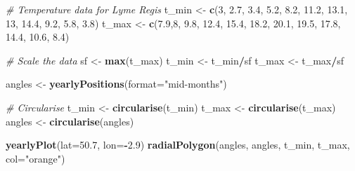 \documentclass[
]{book}
\newenvironment{Shaded}{\begin{snugshade}}{\end{snugshade}}
\newcommand{\AttributeTok}[1]{\textcolor[rgb]{0.13,0.29,0.53}{#1}}
\newcommand{\CommentTok}[1]{\textcolor[rgb]{0.56,0.35,0.01}{\textit{#1}}}
\newcommand{\DecValTok}[1]{\textcolor[rgb]{0.00,0.00,0.81}{#1}}
\newcommand{\FloatTok}[1]{\textcolor[rgb]{0.00,0.00,0.81}{#1}}
\newcommand{\FunctionTok}[1]{\textcolor[rgb]{0.13,0.29,0.53}{\textbf{#1}}}
\newcommand{\NormalTok}[1]{#1}
\newcommand{\OtherTok}[1]{\textcolor[rgb]{0.56,0.35,0.01}{#1}}
\newcommand{\SpecialCharTok}[1]{\textcolor[rgb]{0.81,0.36,0.00}{\textbf{#1}}}
\newcommand{\StringTok}[1]{\textcolor[rgb]{0.31,0.60,0.02}{#1}}
\begin{document}
\begin{Shaded}
\begin{Highlighting}[]
\CommentTok{\# Temperature data for Lyme Regis}
\NormalTok{t\_min }\OtherTok{\textless{}{-}} \FunctionTok{c}\NormalTok{(}\DecValTok{3}\NormalTok{, }\FloatTok{2.7}\NormalTok{, }\FloatTok{3.4}\NormalTok{, }\FloatTok{5.2}\NormalTok{, }\FloatTok{8.2}\NormalTok{, }\FloatTok{11.2}\NormalTok{, }\FloatTok{13.1}\NormalTok{, }\DecValTok{13}\NormalTok{, }\FloatTok{14.4}\NormalTok{, }\FloatTok{9.2}\NormalTok{, }\FloatTok{5.8}\NormalTok{, }\FloatTok{3.8}\NormalTok{)}
\NormalTok{t\_max }\OtherTok{\textless{}{-}} \FunctionTok{c}\NormalTok{(}\FloatTok{7.9}\NormalTok{,}\DecValTok{8}\NormalTok{, }\FloatTok{9.8}\NormalTok{, }\FloatTok{12.4}\NormalTok{, }\FloatTok{15.4}\NormalTok{, }\FloatTok{18.2}\NormalTok{, }\FloatTok{20.1}\NormalTok{, }\FloatTok{19.5}\NormalTok{, }\FloatTok{17.8}\NormalTok{, }\FloatTok{14.4}\NormalTok{, }\FloatTok{10.6}\NormalTok{, }\FloatTok{8.4}\NormalTok{)}

\CommentTok{\# Scale the data}
\NormalTok{sf }\OtherTok{\textless{}{-}} \FunctionTok{max}\NormalTok{(t\_max)}
\NormalTok{t\_min }\OtherTok{\textless{}{-}}\NormalTok{ t\_min}\SpecialCharTok{/}\NormalTok{sf}
\NormalTok{t\_max }\OtherTok{\textless{}{-}}\NormalTok{ t\_max}\SpecialCharTok{/}\NormalTok{sf}

\NormalTok{angles }\OtherTok{\textless{}{-}} \FunctionTok{yearlyPositions}\NormalTok{(}\AttributeTok{format=}\StringTok{"mid{-}months"}\NormalTok{)}

\CommentTok{\# Circularise}
\NormalTok{t\_min }\OtherTok{\textless{}{-}} \FunctionTok{circularise}\NormalTok{(t\_min)}
\NormalTok{t\_max }\OtherTok{\textless{}{-}} \FunctionTok{circularise}\NormalTok{(t\_max)}
\NormalTok{angles }\OtherTok{\textless{}{-}} \FunctionTok{circularise}\NormalTok{(angles)}

\FunctionTok{yearlyPlot}\NormalTok{(}\AttributeTok{lat=}\FloatTok{50.7}\NormalTok{, }\AttributeTok{lon=}\SpecialCharTok{{-}}\FloatTok{2.9}\NormalTok{)}
\FunctionTok{radialPolygon}\NormalTok{(angles, angles, t\_min, t\_max, }\AttributeTok{col=}\StringTok{"orange"}\NormalTok{)}
\end{Highlighting}
\end{Shaded}
\end{document}
